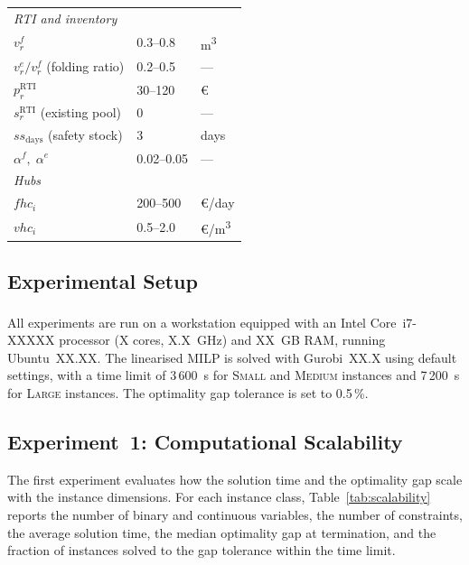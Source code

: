 \begin{table}[ht]
\begin{tabular}{lll}
\midrule
\multicolumn{3}{l}{\textit{RTI and inventory}} \\
$v^f_r$
  & 0.3--0.8  & m\textsuperscript{3} \\
$v^e_r / v^f_r$ (folding ratio)
  & 0.2--0.5  & --- \\
$p^{\text{RTI}}_r$
  & 30--120  & \euro \\
$s^{\text{RTI}}_r$ (existing pool)
  & 0  & --- \\
$ss_{\text{days}}$ (safety stock)
  & 3  & days \\
$\alpha^f,\; \alpha^e$
  & 0.02--0.05  & --- \\
\midrule
\multicolumn{3}{l}{\textit{Hubs}} \\
$fhc_i$
  & 200--500  & \euro/day \\
$vhc_i$
  & 0.5--2.0  & \euro/m\textsuperscript{3} \\
\bottomrule
\end{tabular}
\end{table}


\subsection{Experimental Setup}
\label{sec:exp-setup}

All experiments are run on a workstation equipped with an
Intel\textsuperscript{\textregistered} Core\texttrademark\
i7-XXXXX processor (X cores, X.X~GHz) and XX~GB RAM, running
Ubuntu~XX.XX. The linearised MILP is solved with Gurobi~XX.X
using default settings, with a time limit of 3\,600~s for
\textsc{Small} and \textsc{Medium} instances and 7\,200~s for
\textsc{Large} instances. The optimality gap tolerance is set to
0.5\,\%.


\subsection{Experiment~1: Computational Scalability}
\label{sec:exp-scalability}

The first experiment evaluates how the solution time and the
optimality gap scale with the instance dimensions. For each
instance class, Table~\ref{tab:scalability} reports the number of
binary and continuous variables, the number of constraints, the
average solution time, the median optimality gap at termination,
and the fraction of instances solved to the gap tolerance within
the time limit.

